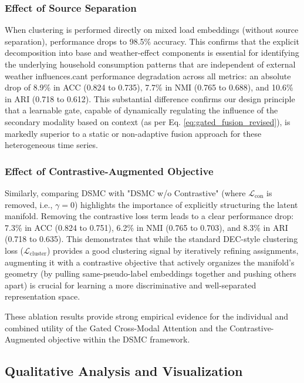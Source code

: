 \documentclass[journal]{IEEEtran}
\begin{document}
\subsubsection{Effect of Source Separation}
When clustering is performed directly on mixed load embeddings (without source separation), performance drops to 98.5\% accuracy. This confirms that the explicit decomposition into base and weather-effect components is essential for identifying the underlying household consumption patterns that are independent of external weather influences.cant performance degradation across all metrics: an absolute drop of 8.9\% in ACC (0.824 to 0.735), 7.7\% in NMI (0.765 to 0.688), and 10.6\% in ARI (0.718 to 0.612). This substantial difference confirms our design principle that a learnable gate, capable of dynamically regulating the influence of the secondary modality based on context (as per Eq. \ref{eq:gated_fusion_revised}), is markedly superior to a static or non-adaptive fusion approach for these heterogeneous time series.

\subsubsection{Effect of Contrastive-Augmented Objective}
Similarly, comparing DSMC with "DSMC w/o Contrastive" (where $\mathcal{L}_{\text{con}}$ is removed, i.e., $\gamma=0$) highlights the importance of explicitly structuring the latent manifold. Removing the contrastive loss term leads to a clear performance drop: 7.3\% in ACC (0.824 to 0.751), 6.2\% in NMI (0.765 to 0.703), and 8.3\% in ARI (0.718 to 0.635). This demonstrates that while the standard DEC-style clustering loss ($\mathcal{L}_{\text{cluster}}$) provides a good clustering signal by iteratively refining assignments, augmenting it with a contrastive objective that actively organizes the manifold's geometry (by pulling same-pseudo-label embeddings together and pushing others apart) is crucial for learning a more discriminative and well-separated representation space.

These ablation results provide strong empirical evidence for the individual and combined utility of the Gated Cross-Modal Attention and the Contrastive-Augmented objective within the DSMC framework.

\subsection{Qualitative Analysis and Visualization}
\end{document}
